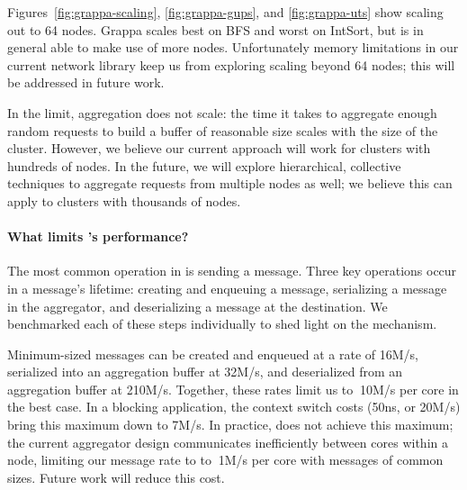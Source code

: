 Figures~\ref{fig:grappa-scaling}, \ref{fig:grappa-gups}, and
\ref{fig:grappa-uts} show scaling out to 64 nodes. Grappa scales best
on BFS and worst on IntSort, but is in general able to make use of
more nodes. Unfortunately memory limitations in our current network
library keep us from exploring scaling beyond 64 nodes; this will be
addressed in future work.

In the limit, aggregation does not scale: the time it takes to
aggregate enough random requests to build a buffer of reasonable size
scales with the size of the cluster. However, we believe our current
approach will work for clusters with hundreds of nodes. In the future,
we will explore hierarchical, collective techniques to aggregate
requests from multiple nodes as well; we believe this can apply to
clusters with thousands of nodes.

\paragraph{What limits \Grappa's performance?}
The most common operation in \Grappa is sending a message. Three key
operations occur in a message's lifetime: creating and enqueuing a
message, serializing a message in the aggregator, and deserializing a
message at the destination. We benchmarked each of these steps
individually to shed light on the mechanism.

Minimum-sized messages can be created and enqueued at a rate of 16M/s,
serialized into an aggregation buffer at 32M/s, and deserialized from
an aggregation buffer at 210M/s.  Together, these rates limit us to
$~$10M/s per core in the best case. In a blocking application, the
context switch costs (50ns, or 20M/s) bring this maximum down to
7M/s. In practice, \Grappa does not achieve this maximum; the current
aggregator design communicates inefficiently between cores within a
node, limiting our message rate to to $~$1M/s per core with messages
of common sizes. Future work will reduce this cost.  







